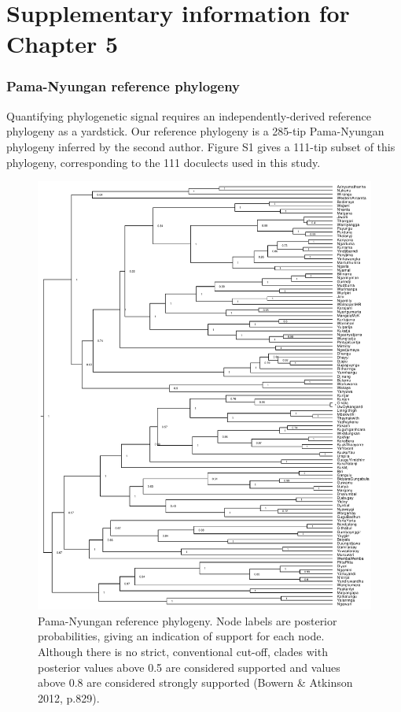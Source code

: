 \chapter{Supplementary information for Chapter 5}

\hypertarget{pama-nyungan-reference-phylogeny}{%
\subsection{Pama-Nyungan reference
phylogeny}\label{pama-nyungan-reference-phylogeny}}

Quantifying phylogenetic signal requires an independently-derived
reference phylogeny as a yardstick. Our reference phylogeny is a 285-tip
Pama-Nyungan phylogeny inferred by the second author. Figure S1 gives a
111-tip subset of this phylogeny, corresponding to the 111 doculects
used in this study.

\begin{figure}
\includegraphics[width=1\linewidth]{Appendix-B/fig/PN_beast_pruned} \caption{Pama-Nyungan reference phylogeny. Node labels are posterior probabilities, giving an indication of support for each node. Although there is no strict, conventional cut-off, clades with posterior values above 0.5 are considered supported and values above 0.8 are considered strongly supported (Bowern \& Atkinson 2012, p.829).}\label{fig:plot-ref-tree2}
\end{figure}

